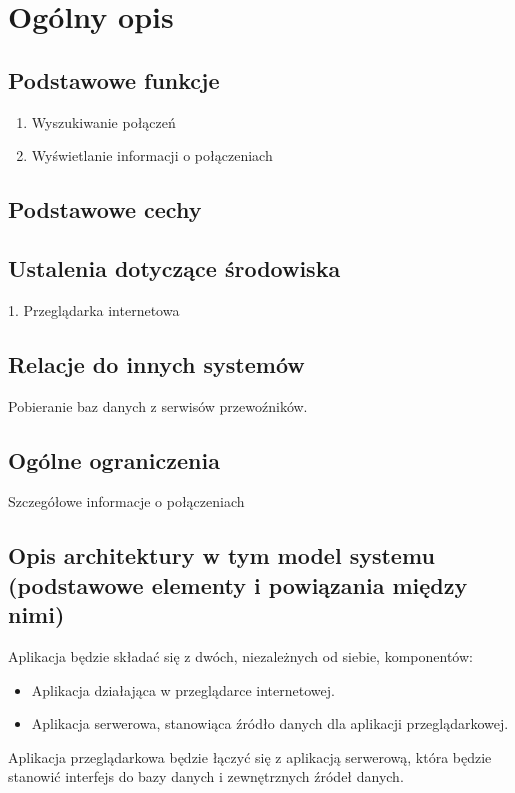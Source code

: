 \documentclass[12pt,a4paper]{report}
\begin{document}
\section{Ogólny opis}
\subsection{Podstawowe funkcje}
\begin{enumerate}
	\item  Wyszukiwanie połączeń
	\item  Wyświetlanie informacji o połączeniach
\end{enumerate}
\subsection{Podstawowe cechy}
\subsection{Ustalenia dotyczące środowiska}
	1. Przeglądarka internetowa
\subsection{Relacje do innych systemów}
 	Pobieranie baz danych z serwisów przewoźników.
\subsection{Ogólne ograniczenia}	
 	Szczegółowe informacje o połączeniach
\subsection{Opis architektury w tym model systemu (podstawowe elementy i powiązania między nimi)}
Aplikacja będzie składać się z dwóch, niezależnych od siebie, komponentów:
\begin{itemize}
	\item Aplikacja działająca w przeglądarce internetowej.
	\item Aplikacja serwerowa, stanowiąca źródło danych dla aplikacji przeglądarkowej.
\end{itemize} 
	Aplikacja przeglądarkowa będzie łączyć się z aplikacją serwerową, która będzie stanowić interfejs do bazy danych i zewnętrznych źródeł danych.
\end{document}
